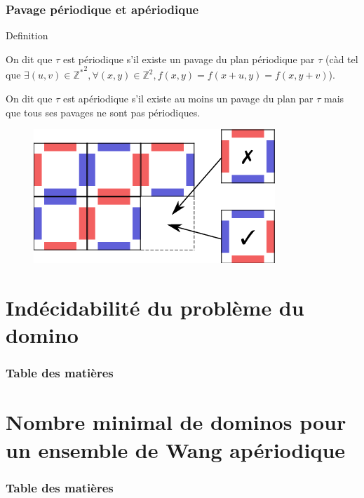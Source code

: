 \documentclass{beamer}
\newcommand{\Z}{\mathbb Z}
\begin{document}
\begin{frame}
\frametitle{Pavage périodique et apériodique}

\begin{alertblock}{Definition}

On dit que $\tau$ est périodique s'il existe un pavage du plan périodique par $\tau$
(càd tel que $\exists (u,v) \in {\Z^*}^2, \forall (x,y) \in \Z^2, f(x,y) = f(x+u,y)=f(x,y+v)$).

On dit que $\tau$ est apériodique s'il existe au moins un pavage du plan par $\tau$ mais que tous ses pavages ne sont pas périodiques.
    
\end{alertblock}

\begin{figure}

    \includegraphics[scale = 0.5]{pavage_periodique}
    \centering
    
\end{figure}

\end{frame}

\section{Indécidabilité du problème du domino}

\begin{frame}
    \frametitle{Table des matières}
    \tableofcontents[currentsection]
  \end{frame}

\section{Nombre minimal de dominos pour un ensemble de Wang apériodique}

\begin{frame}
    \frametitle{Table des matières}
    \tableofcontents[currentsection]
  \end{frame}
\end{document}
